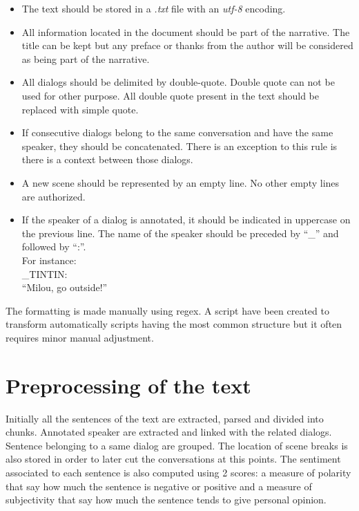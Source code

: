 \documentclass[a4paper, 12pt]{report}
\begin{document}
\begin{itemize}
\item The text should be stored in a \textit{.txt} file with an \textit{utf-8} encoding.
\item All information located in the document should be part of the narrative. The title can be kept but any preface or thanks from the author will be considered as being part of the narrative.
\item All dialogs should be delimited by double-quote. Double quote can not be used for other purpose. All double quote present in the text should be replaced with simple quote.
\item If consecutive dialogs belong to the same conversation and have the same speaker, they should be concatenated. There is an exception to this rule is there is a context between those dialogs.
\item A new scene should be represented by an empty line. No other empty lines are authorized.
\item If the speaker of a dialog is annotated, it should be indicated in uppercase on the previous line. The name of the speaker should be preceded by ``\_'' and followed by  ``:''.\\
 For instance: \\
	\_TINTIN:\\
	``Milou, go outside!''\\
\end{itemize}

The formatting is made manually using regex. A script have been created to transform automatically scripts having the most common structure  but it often requires minor manual adjustment.

\section{Preprocessing of the text}
Initially all the sentences of the text are extracted, parsed and divided into chunks. Annotated speaker are extracted and linked with the related dialogs. Sentence belonging to a same dialog are grouped. The location of scene breaks is also stored in order to later cut the conversations at this points. The sentiment associated to each sentence is also computed using 2 scores: a measure of polarity that say how much the sentence is negative or positive and a measure of subjectivity that say how much the sentence tends to give personal opinion.
\end{document}
